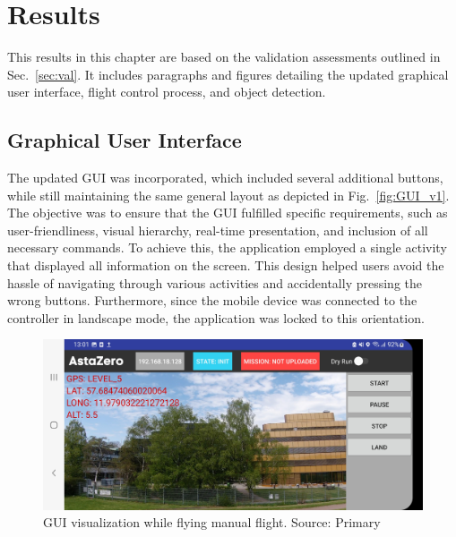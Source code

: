 \chapter{Results}
This results in this chapter are based on the validation assessments outlined in Sec.~\ref{sec:val}. It includes paragraphs and figures detailing the updated graphical user interface, flight control process, and object detection. 

\section{Graphical User Interface}\label{res: GUI}
The updated GUI was incorporated, which included several additional buttons, while still maintaining the same general layout as depicted in Fig.~\ref{fig:GUI_v1}. The objective was to ensure that the GUI fulfilled specific requirements, such as user-friendliness, visual hierarchy, real-time presentation, and inclusion of all necessary commands. To achieve this, the application employed a single activity that displayed all information on the screen. This design helped users avoid the hassle of navigating through various activities and accidentally pressing the wrong buttons. Furthermore, since the mobile device was connected to the controller in landscape mode, the application was locked to this orientation.
\newline
\begin{figure}[!h]
    \centering
    \includegraphics[width=1\textwidth]{figure/gui_klar.jpg}
    \caption{GUI visualization while flying manual flight. Source: Primary}
    \label{fig:gui_klar}
\end{figure}

